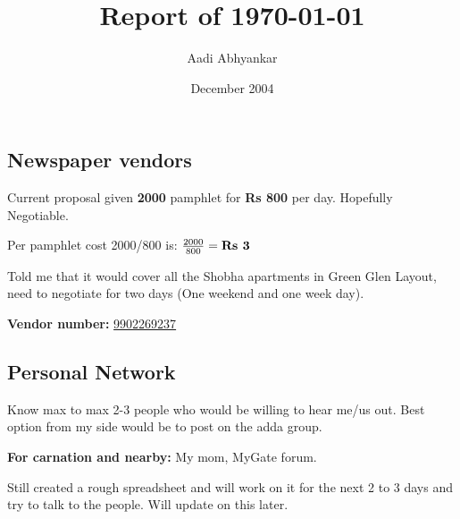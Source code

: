 \documentclass[12pt, a4paper]{article}
\begin{document}
\title{Report of \today}
\author{Aadi Abhyankar}
\date{December 2004}
\maketitle

\subsection{Newspaper vendors}

Current proposal given \textbf{2000} pamphlet for \textbf{Rs 800} per day. Hopefully Negotiable.

\vspace{0.5cm}

Per pamphlet cost 2000/800 is: $\frac{2000}{800} = \textbf{Rs \the\numexpr 2000 / 800 \relax} $

\bigskip

\noindent Told me that it would cover all the Shobha apartments in Green Glen Layout, need to negotiate for two days (One weekend and one week day).

\bigskip

\textbf{Vendor number:} \href{tel:+919902269237}{9902269237}

\subsection{Personal Network}

Know max to max 2-3 people who would be willing to hear me/us out. Best option from my side would be to post on the adda group.

\vspace{0.25cm}

\noindent \textbf{For carnation and nearby:} My mom, MyGate forum.

\vspace{0.25cm}

\noindent Still created a rough spreadsheet and will work on it for the next 2 to 3 days and try to talk to the people. Will update on this later.
\end{document}
